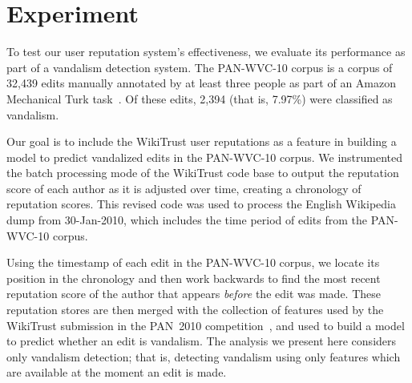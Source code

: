 \section{Experiment}

To test our user reputation system's effectiveness, we
evaluate its performance as part of a vandalism
detection system.
The PAN-WVC-10 corpus is a corpus of 32,439 edits manually
annotated by at least three people as part of an Amazon
Mechanical Turk task~\cite{Potthast2010a}.
Of these edits, 2,394 (that is, 7.97\%) were classified as vandalism.

Our goal is to include the WikiTrust user reputations as a
feature in building a model to predict vandalized edits in
the PAN-WVC-10 corpus.
We instrumented the batch processing mode of the WikiTrust
code base to output the reputation score of each author as
it is adjusted over time, creating a chronology of reputation scores.
This revised code was used to process the English Wikipedia
dump from 30-Jan-2010, which includes the time period of
edits from the PAN-WVC-10 corpus.

Using the timestamp of each edit in the PAN-WVC-10 corpus,
we locate its position in the chronology and then work backwards
to find the most recent reputation score of the author
that appears \textit{before} the edit was made.
These reputation stores are then merged with the collection
of features used by the WikiTrust submission in the PAN~2010
competition~\cite{Adler2010b}, and used to build a model to predict
whether an edit is vandalism.
The analysis we present here considers only  vandalism
detection; that is, detecting vandalism using only features which are
available at the moment an edit is made.


